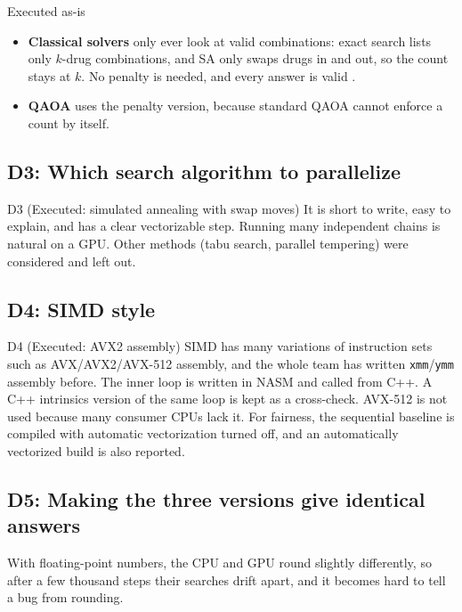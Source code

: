 \begin{decision}{Executed as-is}
\begin{itemize}[leftmargin=*]
\item \textbf{Classical solvers} only ever look at valid combinations: exact search lists only $k$-drug combinations, and SA only swaps drugs in and out, so the count stays at $k$. No penalty is needed, and every answer is valid \proposed.
\item \textbf{QAOA} uses the penalty version, because standard QAOA cannot enforce a count by itself.
\end{itemize}
\end{decision}

\subsection{D3: Which search algorithm to parallelize}

\begin{decision}{D3 (Executed: simulated annealing with swap moves)}
It is short to write, easy to explain, and has a clear vectorizable step. Running many independent chains is natural on a GPU. Other methods (tabu search, parallel tempering) were considered and left out.
\end{decision}

\subsection{D4: SIMD style}

\begin{decision}{D4 (Executed: AVX2 assembly)}
SIMD has many variations of instruction sets such as AVX/AVX2/AVX-512 assembly, and the whole team has written \texttt{xmm}/\texttt{ymm} assembly before. The inner loop is written in NASM and called from C++. A C++ intrinsics version of the same loop is kept as a cross-check. AVX-512 is not used because many consumer CPUs lack it. For fairness, the sequential baseline is compiled with automatic vectorization turned off, and an automatically vectorized build is also reported.
\end{decision}

\subsection{D5: Making the three versions give identical answers}

With floating-point numbers, the CPU and GPU round slightly differently, so after a few thousand steps their searches drift apart, and it becomes hard to tell a bug from rounding.

